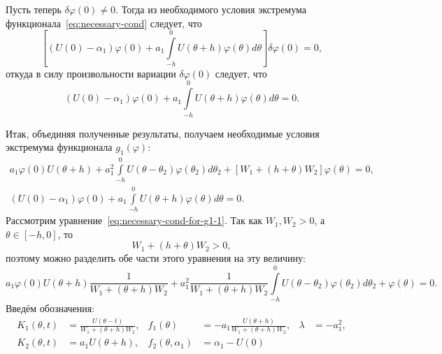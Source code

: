 \documentclass[a4paper,14pt]{article}
\theoremstyle{definition}
\begin{document}
Пусть теперь $\delta \varphi(0) \neq 0$. Тогда из необходимого условия
экстремума функционала~\eqref{eq:necessary-cond} следует, что
\begin{equation*}
  \left[
    \left( U(0) - \alpha_1 \right) \varphi(0)
    +
    a_1
    \int\limits_{-h}^{0} U(\theta + h) \varphi(\theta) d\theta
  \right] \delta \varphi(0)
  = 0,
\end{equation*}
откуда в силу произвольности вариации $\delta \varphi(0)$
следует, что
\begin{equation*}
  \left( U(0) - \alpha_1 \right) \varphi(0)
  +
  a_1
  \int\limits_{-h}^{0} U(\theta + h) \varphi(\theta) d\theta
  = 0.
\end{equation*}

Итак, объединяя полученные результаты, получаем необходимые условия
экстремума функционала $g_1(\varphi)$:
\begin{align}
  \label{eq:necessary-cond-for-g1-1}
  a_1 \varphi(0)
  U(\theta + h)
  +
  a_1^2
  \int\limits_{-h}^{0}
  U(\theta - \theta_2) \varphi(\theta_2)
  d\theta_2
  +
  \left[ W_1 + (h + \theta) W_2 \right] \varphi(\theta)
  = 0, \\
  \label{eq:necessary-cond-for-g1-2}
  \left( U(0) - \alpha_1 \right) \varphi(0)
  +
  a_1
  \int\limits_{-h}^{0} U(\theta + h) \varphi(\theta) d\theta
  = 0.
\end{align}
Рассмотрим уравнение~\eqref{eq:necessary-cond-for-g1-1}. Так как
$W_1, W_2 > 0$, а $\theta \in [-h, 0]$, то
\begin{equation*}
  W_1 + (h + \theta) W_2 > 0,
\end{equation*}
поэтому можно разделить обе части этого уравнения на эту величину:
\begin{equation*}
    a_1 \varphi(0)
    U(\theta + h)
    \frac{1}{W_1 + (\theta + h) W_2}
    +
    a_1^2
    \frac{1}{W_1 + (\theta + h) W_2}
    \int\limits_{-h}^{0}
    U(\theta - \theta_2) \varphi(\theta_2)
    d\theta_2
    +
    \varphi(\theta)
    = 0.
\end{equation*}
Введём обозначения:
\begin{equation}
  \label{eq:necessary-cond-notation}
  \begin{aligned}
    K_1(\theta, t)
    &=
      \frac{U(\theta - t)}{W_1 + (\theta + h) W_2},
    &
      f_1(\theta)
    &=
      - a_1
      \frac{U(\theta + h)}{W_1 + (\theta + h) W_2},
    &
      \lambda &= -a_1^2, \\
    K_2(\theta, t)
    &=
      a_1 U(\theta + h),
    &
      f_2(\theta, \alpha_1)
    &=
      \alpha_1 - U(0)
  \end{aligned}
\end{equation}
\end{document}
